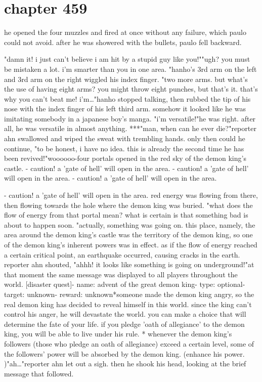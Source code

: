 \section{chapter 459}

he opened the four muzzles and fired at once without any failure, which paulo could not avoid.
 after he was showered with the bullets, paulo fell backward.





"damn it! i just can't believe i am hit by a stupid guy like you!""ugh? you must be mistaken a lot.
 i'm smarter than you in one area.
"hanho's 3rd arm on the left and 3rd arm on the right wiggled his index finger.
"two more arms.
 but what's the use of having eight arms? you might throw eight punches, but that's it.
 that's why you can't beat me! i'm…"hanho stopped talking, then rubbed the tip of his nose with the index finger of his left third arm.
 somehow it looked like he was imitating somebody in a japanese boy's manga.
 "i'm versatile!"he was right.
after all, he was versatile in almost anything.
***"man, when can he ever die?"reporter ahn swallowed and wiped the sweat with trembling hands.
only then could he continue, "to be honest, i have no idea.
 this is already the second time he has been revived!"woooooo-four portals opened in the red sky of the demon king's castle.
- caution! a 'gate of hell' will open in the area.
- caution! a 'gate of hell' will open in the area.
- caution! a 'gate of hell' will open in the area.

- caution! a 'gate of hell' will open in the area.
red energy was flowing from there, then flowing towards the hole where the demon king was buried.
"what does the flow of energy from that portal mean? what is certain is that something bad is about to happen soon.
"actually, something was going on.
 this place, namely, the area around the demon king's castle was the territory of the demon king, so one of the demon king's inherent powers was in effect.
as if the flow of energy reached a certain critical point, an earthquake occurred, causing cracks in the earth.
reporter ahn shouted, "ahhh! it looks like something is going on underground!"at that moment the same message was displayed to all players throughout the world.
[disaster quest]- name: advent of the great demon king- type: optional- target: unknown- reward: unknown*someone made the demon king angry, so the real demon king has decided to reveal himself in this world.
 since the king can't control his anger, he will devastate the world.
 you can make a choice that will determine the fate of your life.
 if you pledge 'oath of allegiance' to the demon king, you will be able to live under his rule.
* whenever the demon king's followers (those who pledge an oath of allegiance) exceed a certain level, some of the followers' power will be absorbed by the demon king.
 (enhance his power.
)"ah…"reporter ahn let out a sigh.
 then he shook his head, looking at the brief message that followed.

